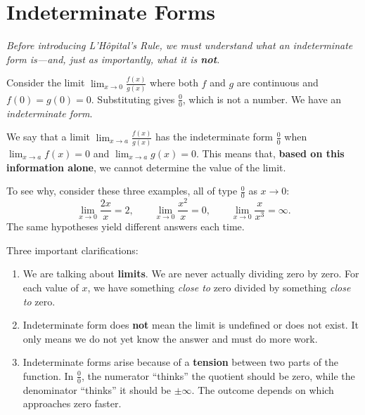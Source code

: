 \section{Indeterminate Forms}
\label{sec:6.5}

\textit{Before introducing L'H\^opital's Rule, we must understand what an indeterminate form is---and, just as importantly, what it is \textbf{not}.}

Consider the limit $\displaystyle\lim_{x \to 0}\frac{f(x)}{g(x)}$ where both $f$ and $g$ are continuous and $f(0) = g(0) = 0$.  Substituting gives $\frac{0}{0}$, which is not a number.  We have an \emph{indeterminate form}.

\begin{definition}
\label{def:6-1}
We say that a limit $\displaystyle\lim_{x \to a}\frac{f(x)}{g(x)}$ has the indeterminate form $\frac{0}{0}$ when $\lim_{x \to a}f(x) = 0$ and $\lim_{x \to a}g(x) = 0$.  This means that, \textbf{based on this information alone}, we cannot determine the value of the limit.
\end{definition}

To see why, consider these three examples, all of type $\frac{0}{0}$ as $x \to 0$:
\[
  \lim_{x \to 0}\frac{2x}{x} = 2, \qquad
  \lim_{x \to 0}\frac{x^{2}}{x} = 0, \qquad
  \lim_{x \to 0}\frac{x}{x^{3}} = \infty.
\]
The same hypotheses yield different answers each time.

\begin{remark}[Warning]
Three important clarifications:
\begin{enumerate}[label=(\roman*)]
  \item We are talking about \textbf{limits}.  We are never actually dividing zero by zero.  For each value of $x$, we have something \emph{close to} zero divided by something \emph{close to} zero.
  \item Indeterminate form does \textbf{not} mean the limit is undefined or does not exist.  It only means we do not yet know the answer and must do more work.
  \item Indeterminate forms arise because of a \textbf{tension} between two parts of the function.  In $\frac{0}{0}$, the numerator ``thinks'' the quotient should be zero, while the denominator ``thinks'' it should be $\pm\infty$.  The outcome depends on which approaches zero faster.
\end{enumerate}
\end{remark}

